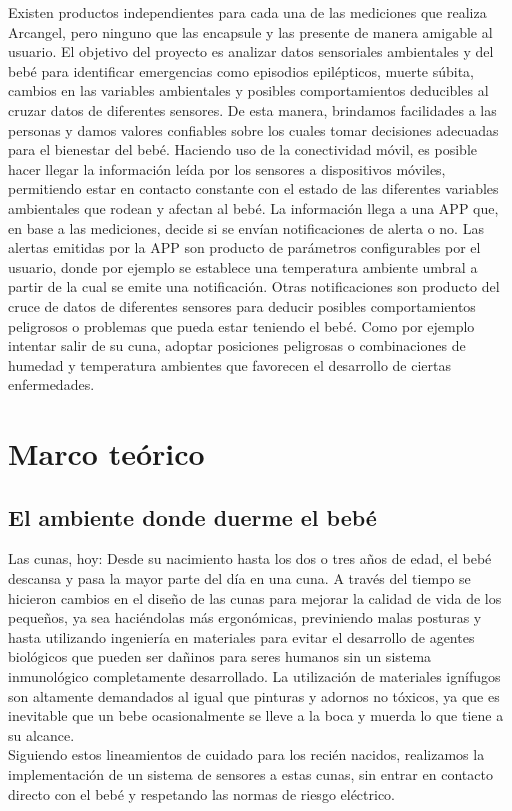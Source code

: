 \documentclass{IEEEtran}
\begin{document}
		Existen productos independientes para cada una de las mediciones que realiza Arcangel, pero ninguno que las encapsule y las presente de manera amigable al usuario.
El objetivo del proyecto es analizar datos sensoriales ambientales y del bebé para identificar emergencias como episodios epilépticos, muerte súbita, cambios en las variables ambientales y posibles comportamientos deducibles al cruzar datos de diferentes sensores.
De esta manera, brindamos facilidades a las personas y damos valores confiables sobre los cuales tomar decisiones adecuadas para el bienestar del bebé.
Haciendo uso de la conectividad móvil, es posible hacer llegar la información leída por los sensores a dispositivos móviles, permitiendo estar en contacto constante con el estado de las diferentes variables ambientales que rodean y afectan al bebé.
La información llega a una APP que, en base a las mediciones, decide si se envían notificaciones de alerta o no.
Las alertas emitidas por la APP son producto de parámetros configurables por el usuario, donde por ejemplo se establece una temperatura ambiente umbral a partir de la cual se emite una notificación.
Otras notificaciones son producto del cruce de datos de diferentes sensores para deducir posibles comportamientos peligrosos o problemas que pueda estar teniendo el bebé. Como por ejemplo intentar salir de su cuna, adoptar posiciones peligrosas o combinaciones de humedad y temperatura ambientes que favorecen el desarrollo de ciertas enfermedades.


	\section{Marco teórico}

		\subsection{El ambiente donde duerme el bebé}
		
			Las cunas, hoy: Desde su nacimiento hasta los dos o tres años de edad, el bebé descansa y pasa la mayor parte del día en una cuna. A través del tiempo se hicieron cambios en el diseño de las cunas para mejorar la calidad de vida de los pequeños, ya sea haciéndolas más ergonómicas, previniendo malas posturas y hasta utilizando ingeniería en materiales para evitar el desarrollo de agentes biológicos que pueden ser dañinos para seres humanos sin un sistema inmunológico completamente desarrollado. La utilización de materiales ignífugos son altamente demandados al igual que pinturas y adornos no tóxicos, ya que es inevitable que un bebe ocasionalmente se lleve a la boca y muerda lo que tiene a su alcance.\\
            Siguiendo estos lineamientos de cuidado para los recién nacidos, realizamos la implementación de un sistema de sensores a estas cunas, sin entrar en contacto directo con el bebé y respetando las normas de riesgo eléctrico.\\
            
\end{document}
